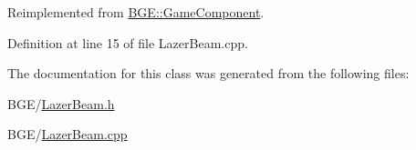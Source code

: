 Reimplemented from \hyperlink{class_b_g_e_1_1_game_component_ac8e444827ee0be9ad654cdff4d15f071}{B\-G\-E\-::\-Game\-Component}.



Definition at line 15 of file Lazer\-Beam.\-cpp.



The documentation for this class was generated from the following files\-:\begin{DoxyCompactItemize}
\item 
B\-G\-E/\hyperlink{_lazer_beam_8h}{Lazer\-Beam.\-h}\item 
B\-G\-E/\hyperlink{_lazer_beam_8cpp}{Lazer\-Beam.\-cpp}\end{DoxyCompactItemize}

